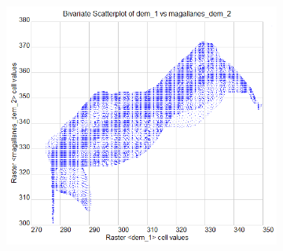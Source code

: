 \documentclass{sigchi}
\begin{document}
\begin{figure}
\begin{minipage}[t]{0.33\textwidth}
\begin{subfigure}{\linewidth}
            \caption{}~\label{fig:diff_2}
        \end{subfigure}\\
        \begin{subfigure}{\linewidth}
            \centering
            \includegraphics[width=\textwidth]{figures/magallanes/magallanes_bivariate_2.png}%
            \caption{}~\label{fig:bivar_2}
        \end{subfigure}\\ 
        \captionsetup{width=.9\linewidth}
        \caption{\textbf{Participant's model for Ex.~2 using projection augmented modeling:} \\
        (a) the DEM, \\
        (b) the difference between the participant's DEM and the reference DEM, and \\
        (c) the bivariate scatterplot of the difference between the participant's DEM and the reference DEM. %
        }~\label{fig:results_2}
    \end{minipage}
%
    \begin{minipage}[t]{0.33\textwidth}
        \begin{subfigure}{\linewidth}
            \centering

\end{subfigure}
\end{minipage}
\end{figure}
\end{document}
